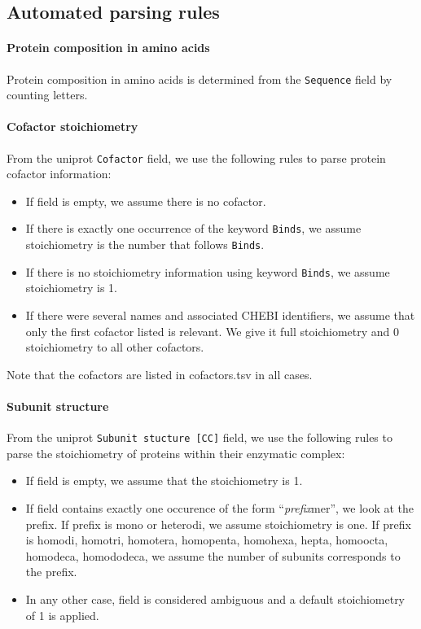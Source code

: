 \subsection{Automated parsing rules}

\paragraph{Protein composition in amino acids}
Protein composition in amino acids is determined from the \texttt{Sequence} field by counting letters.

\paragraph{Cofactor stoichiometry}
From the uniprot \texttt{Cofactor} field,
we use the following rules to parse protein cofactor information:
\begin{itemize}
\item If field is empty, we assume there is no cofactor.
\item If there is exactly one occurrence of the keyword \texttt{Binds},
we assume stoichiometry is the number that follows \texttt{Binds}.
\item If there is no stoichiometry information using keyword \texttt{Binds},
we assume stoichiometry is 1.
\item If there were several names and associated CHEBI identifiers,
we assume that only the first cofactor listed is relevant.
We give it full stoichiometry and 0 stoichiometry to all other cofactors.
\end{itemize}
Note that the cofactors are listed in cofactors.tsv in all cases.

\paragraph{Subunit structure}
From the uniprot \texttt{Subunit stucture [CC]} field,
we use the following rules to parse the stoichiometry of proteins within their enzymatic complex:
\begin{itemize}
\item If field is empty, we assume that the stoichiometry is 1.
\item If field contains exactly one occurence of the form ``\textit{prefix}mer'', we look at the prefix.
If prefix is mono or heterodi, we assume stoichiometry is one.
If prefix is homodi, homotri, homotera, homopenta, homohexa, hepta, homoocta, homodeca, homododeca,
we assume the number of subunits corresponds to the prefix.
\item In any other case, field is considered ambiguous and a default stoichiometry of 1 is applied.
\end{itemize}

